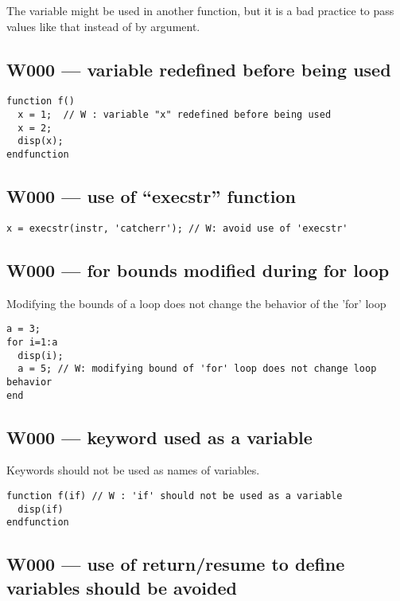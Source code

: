 The variable might be used in another function, but it is
a bad practice to pass values like that instead of by argument.



\subsection{W000 --- variable redefined before being used}


\begin{verbatim}
function f()
  x = 1;  // W : variable "x" redefined before being used
  x = 2;
  disp(x);
endfunction
\end{verbatim}


\subsection{W000 --- use of ``execstr'' function     }


\begin{verbatim}
x = execstr(instr, 'catcherr'); // W: avoid use of 'execstr' 
\end{verbatim}


\subsection{W000 --- for bounds modified during for loop}




Modifying the bounds of a loop does not change the behavior of
the 'for' loop

\begin{verbatim}
a = 3;
for i=1:a
  disp(i);
  a = 5; // W: modifying bound of 'for' loop does not change loop behavior
end
\end{verbatim}


\subsection{W000 --- keyword used as a variable}




Keywords should not be used as names of variables.

\begin{verbatim}
function f(if) // W : 'if' should not be used as a variable
  disp(if)
endfunction
\end{verbatim}


\subsection{W000 --- use of return/resume to define variables should be avoided}


